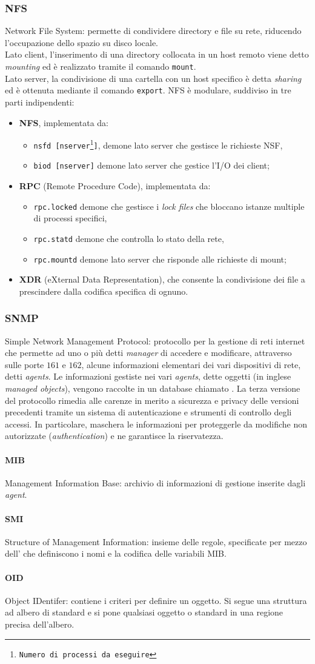 \documentclass[a4paper,11pt]{article}
\def\code#1{\texttt{#1}}
\def\subsub#1{\subsubsection{#1}\label{#1}}
\def\para#1{\paragraph{#1}\label{#1}}
\def\vedi#1{\nameref{#1}}
\def\italic#1{\textit{#1}}
\begin{document}
\subsub{NFS}
Network File System: permette di condividere directory e file su rete, riducendo l'occupazione dello spazio su disco locale.\\Lato client, l'inserimento di una directory collocata in un host remoto viene detto \italic{mounting} ed è realizzato tramite il comando \code{mount}.\\
Lato server, la condivisione di una cartella con un host specifico è detta \italic{sharing} ed è ottenuta mediante il comando \code{export}.
NFS è modulare, suddiviso in tre parti indipendenti:
\begin{itemize}
\item \textbf{NFS}, implementata da: 
\begin{itemize}
\item \code{nsfd [nserver\footnote{Numero di processi da eseguire}]}, demone lato server  che gestisce le richieste NSF,
\item \code{biod [nserver]} demone lato server che gestice l'I/O dei client;
\end{itemize}
\item \textbf{RPC} (Remote Procedure Code), implementata da:
\begin{itemize}
\item \code{rpc.locked} demone che gestisce i \italic{lock files} che bloccano istanze multiple di processi specifici,
\item \code{rpc.statd} demone che controlla lo stato della rete,
\item \code{rpc.mountd} demone lato server che risponde alle richieste di mount;
\end{itemize}
\item \textbf{XDR} (eXternal Data Representation), che consente la condivisione dei file a prescindere dalla codifica specifica di ognuno.
\end{itemize} 
\subsub{SNMP}  %
Simple Network Management Protocol: protocollo per la gestione di reti internet che permette ad uno o più \vedi{DTE} detti \italic{manager} di accedere e modificare, attraverso \vedi{UDP} sulle porte $161$ e $162$, alcune informazioni elementari dei vari dispositivi di rete, detti \italic{agents}. Le informazioni gestiste nei vari \italic{agents}, dette 
oggetti (in inglese \italic{managed objects}), vengono raccolte in un database chiamato \vedi{MIB}.
La terza versione del protocollo rimedia alle carenze in merito a sicurezza e privacy delle versioni precedenti tramite un sistema di autenticazione e strumenti di controllo degli accessi. In particolare, maschera le informazioni per proteggerle da modifiche non autorizzate (\italic{authentication}) e ne garantisce la riservatezza.
\para{MIB} Management Information Base: archivio di informazioni di gestione inserite dagli \textit{agent}.
\para{SMI} Structure of Management Information: insieme delle regole, specificate per mezzo dell'\vedi{ASN.1} che definiscono i nomi e la codifica delle variabili MIB. 
\para{OID} Object IDentifer: contiene i criteri per definire un
oggetto. Si segue una struttura ad albero di standard e
si pone qualsiasi oggetto o standard in una regione
precisa dell’albero. 
 
\end{document}
